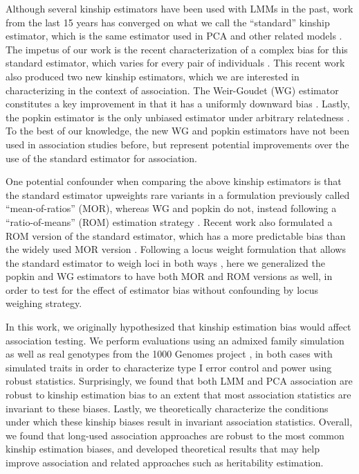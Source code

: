 \documentclass[11pt]{article}
\begin{document}
Although several kinship estimators have been used with LMMs in the past, work from the last 15 years has converged on what we call the ``standard'' kinship estimator, which is the same estimator used in PCA and other related models \citep{price_principal_2006, astle_population_2009, rakovski_kinship-based_2009, thornton_roadtrips:_2010, yang_common_2010, yang_gcta:_2011, zhou_genome-wide_2012, speed_improved_2012, yang_advantages_2014, speed_relatedness_2015, loh_efficient_2015, wang_efficient_2017, sul_population_2018}.
The impetus of our work is the recent characterization of a complex bias for this standard estimator, which varies for every pair of individuals \citep{weir_unified_2017, ochoa_estimating_2021}.
This recent work also produced two new kinship estimators, which we are interested in characterizing in the context of association.
The Weir-Goudet (WG) estimator constitutes a key improvement in that it has a uniformly downward bias \citep{weir_unified_2017, ochoa_estimating_2021}.
Lastly, the popkin estimator is the only unbiased estimator under arbitrary relatedness \citep{ochoa_estimating_2021}.
To the best of our knowledge, the new WG and popkin estimators have not been used in association studies before, but represent potential improvements over the use of the standard estimator for association.

One potential confounder when comparing the above kinship estimators is that the standard estimator upweights rare variants in a formulation previously called ``mean-of-ratios'' (MOR), whereas WG and popkin do not, instead following a ``ratio-of-means'' (ROM) estimation strategy \citep{bhatia_estimating_2013, ochoa_estimating_2021}.
Recent work also formulated a ROM version of the standard estimator, which has a more predictable bias than the widely used MOR version \citep{ochoa_estimating_2021}.
Following a locus weight formulation that allows the standard estimator to weigh loci in both ways \citep{wang_efficient_2017}, here we generalized the popkin and WG estimators to have both MOR and ROM versions as well, in order to test for the effect of estimator bias without confounding by locus weighing strategy.

In this work, we originally hypothesized that kinship estimation bias would affect association testing.
We perform evaluations using an admixed family simulation \citep{yao_limitations_2022} as well as real genotypes from the 1000 Genomes project \citep{the_1000_genomes_project_consortium_map_2010, 1000_genomes_project_consortium_integrated_2012, fairley_international_2020}, in both cases with simulated traits in order to characterize type I error control and power using robust statistics.
Surprisingly, we found that both LMM and PCA association are robust to kinship estimation bias to an extent that most association statistics are invariant to these biases.
Lastly, we theoretically characterize the conditions under which these kinship biases result in invariant association statistics.
Overall, we found that long-used association approaches are robust to the most common kinship estimation biases, and developed theoretical results that may help improve association and related approaches such as heritability estimation.
\end{document}
